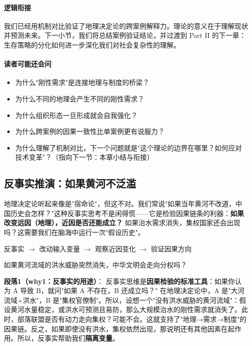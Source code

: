 \documentclass[../main.tex]{subfiles}
\begin{document}
	\paragraph*{逻辑衔接}
	我们已经用机制对比验证了地理决定论的跨案例解释力。理论的意义在于理解现状并预测未来。下一小节，我们将总结案例验证结论，并过渡到 Part II 的下一章：生存策略的分化如何进一步深化我们对社会复杂性的理解。
	
	\paragraph*{读者可能还会问}
	\begin{itemize}
\item 为什么"刚性需求"是连接地理与制度的桥梁？
	\item 为什么不同的地理会产生不同的刚性需求？
	\item 为什么组织形态一旦形成就会自我强化？
	\item 为什么跨案例的因果一致性比单案例更有说服力？
	\item 为什么理解了机制对比，下一个问题就是"这个理论的边界在哪里？如何应对技术变革"？（指向下一节：本章小结与衔接）
\end{itemize}
	

\subsection{反事实推演：如果黄河不泛滥}

\begin{motivation}
	地理决定论听起来像是"宿命论"，但这不对。我们常说"如果当年黄河不改道，中国历史会怎样？"这种反事实思考不是闲得慌——它是检验因果链条的利器：\textbf{如果改变远因（地理），近因是否还能成立？} 如果治水需求消失，集权国家还会出现吗？这需要我们在脑海中运行一次"假设历史"。
\end{motivation}

\begin{logicmap}
	反事实 $\rightarrow$ 改动输入变量 $\rightarrow$ 观察近因变化 $\rightarrow$ 验证因果方向
\end{logicmap}

\begin{questionbox}
	如果黄河流域的洪水威胁突然消失，中华文明会走向分权吗？
\end{questionbox}

\textbf{段落1（why1：反事实的用途）}：  
反事实思维是\textbf{因果检验的标准工具}：如果你认为 A 导致 B，就问"如果 A 不存在，B 还成立吗？" 在地理决定论中，A 是"大河流域+洪水"，B 是"集权官僚制"。所以，设想一个"没有洪水威胁的黄河流域"：假设黄河水量稳定，或洪水可预测且易防，那么大规模治水的刚性需求就消失了。此时，部落联盟是否有动力走向集权？可能不会。这就支持了"地理→需求→制度"的因果链。反之，如果即使没有洪水，集权依然出现，那说明还有其他因素在起作用。所以，反事实帮助我们\textbf{隔离变量}。
\end{document}
